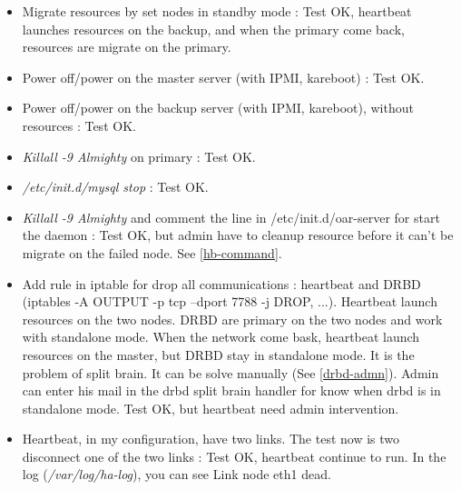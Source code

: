 \documentclass[a4paper,10pt]{report}
\begin{document}
\begin{itemize}
 \item Migrate resources by set nodes in standby mode : Test OK, heartbeat launches resources on the backup, and when the primary come back, resources are migrate on the primary.
 \item Power off/power on the master server (with IPMI, kareboot) : Test OK.
 \item Power off/power on the backup server (with IPMI, kareboot), without resources : Test OK.
 \item \textit{Killall -9 Almighty} on primary : Test OK.
 \item \textit{/etc/init.d/mysql stop} : Test OK.
 \item \textit{Killall -9 Almighty} and comment the line in /etc/init.d/oar-server for start the daemon : Test OK, but admin have to cleanup resource before it can't be migrate on the failed node. See \ref{hb-command}.
 \item Add rule in iptable for drop all communications : heartbeat and DRBD (iptables -A OUTPUT -p tcp --dport 7788 -j DROP, ...). Heartbeat launch resources on the two nodes. DRBD are primary on the two nodes and work with standalone mode. When the network come bask, heartbeat launch resources on the master, but DRBD stay in standalone mode. It is the problem of split brain. It can be solve manually (See \ref{drbd-admn}).
Admin can enter his mail in the drbd split brain handler for know when drbd is in standalone mode. Test OK, but heartbeat need admin intervention.
 \item Heartbeat, in my configuration, have two links. The test now is two disconnect one of the two links : Test OK, heartbeat continue to run. In the log (\textit{/var/log/ha-log}), you can see Link node eth1 dead.
\end{itemize}
\end{document}
